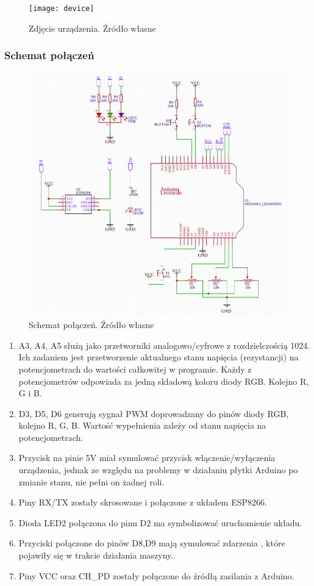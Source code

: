\documentclass[12pt,twoside,polish]{article}
\begin{document}
\begin{figure}[h]
	\centering	
	\texttt{[image: device]}
	\caption{Zdjęcie urządzenia. Źródło własne}
	\label{device}
\end{figure}

\subsubsection*{Schemat połączeń}
\begin{figure}[h]
	\centering	
	\includegraphics[width=\textwidth]{scheme2}
	\caption{Schemat połączeń. Źródło własne}
	\label{scheme}
\end{figure}


\begin{enumerate}[label=\alph*), leftmargin=1.25cm]
	\item A3, A4, A5 służą jako przetworniki analogowo/cyfrowe z rozdzielczością 1024. Ich zadaniem jest przetworzenie aktualnego stanu napięcia (rezystancji) na potencjometrach do wartości całkowitej w programie. Każdy z potencjometrów odpowiada za jedną składową koloru diody RGB. Kolejno R, G i B.
	\item D3, D5, D6 generują sygnał PWM doprowadzany do pinów diody RGB, kolejno R, G, B. Wartość wypełnienia zależy od stanu napięcia na potencjometrach.
	\item Przycisk na pinie 5V miał symulować przycisk włączenie/wyłączenia urządzenia, jednak ze względu na problemy w działaniu płytki Arduino po zmianie stanu, nie pełni on żadnej roli.
	\item Piny RX/TX zostały skrosowane i połączone z układem ESP8266.
	\item Dioda LED2 połączona do pinu D2 ma symbolizować uruchomienie układu.
	\item Przyciski połączone do pinów D8,D9 mają symulować zdarzenia , które pojawiły się w trakcie działania maszyny.
	\item Piny VCC oraz CH\_PD zostały połączone do źródłą zasilania z Arduino.
\end{enumerate}
\end{document}
